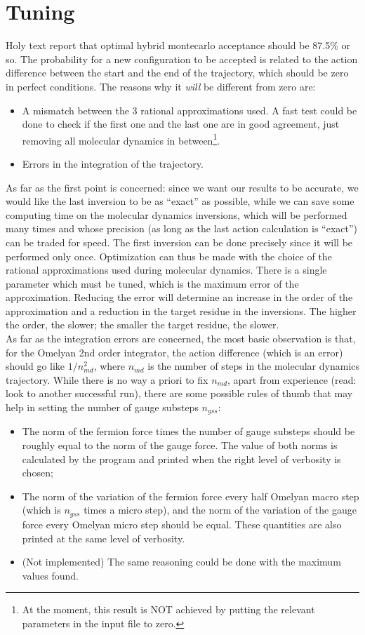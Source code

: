 \documentclass[a4paper,10pt]{book}
\begin{document}
\section{Tuning}
Holy text report that optimal hybrid montecarlo acceptance should be 87.5\% or so. 
The probability for a new configuration to be accepted is related to the action 
difference between the start and the end of the trajectory, which should be zero in 
perfect conditions. The reasons why it \emph{will} be different from zero are:
\begin{itemize}
 \item A mismatch between the 3 rational approximations used. A fast test could be done 
to check if the first one and the last one are in good agreement, just removing all 
molecular dynamics in between\footnote{At the moment, this result is NOT achieved by 
putting the relevant parameters in the input file to zero.}. 
 \item Errors in the integration of the trajectory.
\end{itemize}
As far as the first point is concerned: since we want our results to be accurate, we 
would like the last inversion to be as 
``exact'' as possible, while we can save some computing time on the molecular dynamics 
inversions, which will be performed many times and whose precision (as long as the last 
action calculation is ``exact'') can be traded for speed. The first inversion can be 
done precisely since it will be performed only once. Optimization can thus be made with
the choice of the rational approximations used during molecular dynamics. There is a 
single parameter which must be tuned, which is the maximum error of the approximation. 
Reducing the error will determine an increase in the order of the approximation and a 
reduction in the target residue in the inversions. The higher the order, the slower; 
the smaller the target residue, the slower. \\
As far as the integration errors are concerned, the most basic observation is that, for 
the Omelyan 2nd order integrator, the action difference (which is an error) should go 
like $1/n^2_{md}$, where $n_{md}$ is the number of steps in the molecular dynamics 
trajectory. While there is no way a priori to fix $n_{md}$, apart from experience 
(read: look to another successful run), there are some possible rules of thumb that may 
help in setting the number of gauge substeps $n_{gss}$:
\begin{itemize}
 \item The norm of the fermion force times the number of gauge substeps should be 
roughly equal to the norm of the gauge force. The value of both norms is calculated by 
the program and printed when the right level of verbosity is chosen;
 \item The norm of the variation of the fermion force every half Omelyan macro step 
(which is $n_{gss}$ times a micro step), and the norm of the variation of the gauge 
force every Omelyan micro step should be equal. These quantities are also printed at 
the same level of verbosity.
\item (Not implemented) The same reasoning could be done with the maximum values found.
\end{itemize}
\end{document}
